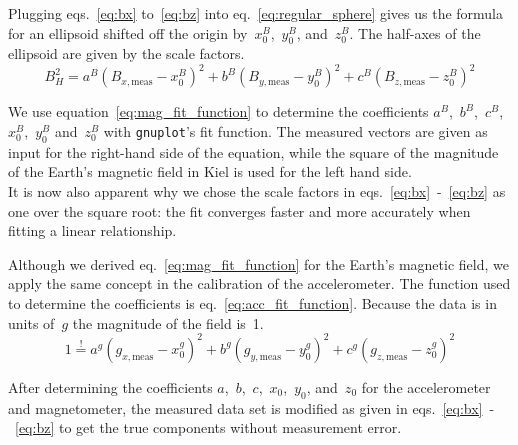 Plugging eqs.~\eqref{eq:bx} to~\eqref{eq:bz} into eq.~\eqref{eq:regular_sphere} gives us the formula for an ellipsoid shifted off the origin by~$x_0^B$,~$y_0^B$, and~$z_0^B$. The half-axes of the ellipsoid are given by the scale factors.
\begin{equation}
    B_{H}^2=a^B(B_{x,\mathrm{meas}}-x_0^B)^2 + b^B(B_{y,\mathrm{meas}}-y_0^B)^2 + c^B(B_{z,\mathrm{meas}}-z_0^B)^2 
    \label{eq:mag_fit_function}
\end{equation}

 We use equation~\eqref{eq:mag_fit_function} to determine the coefficients $a^B$,~$b^B$,~$c^B$,~$x_0^B$,~$y_0^B$ and~$z_0^B$ with \verb|gnuplot|'s fit function. The measured vectors are given as input for the right-hand side of the equation, while the square of the magnitude of the Earth's magnetic field in Kiel is used for the left hand side.\\
It is now also apparent why we chose the scale factors in eqs.~\eqref{eq:bx}~-~\eqref{eq:bz} as one over the square root: the fit converges faster and more accurately when fitting a linear relationship.

Although we derived eq.~\eqref{eq:mag_fit_function} for the Earth's magnetic field, we apply the same concept in the calibration of the accelerometer. The function used to determine the coefficients is eq.~\eqref{eq:acc_fit_function}. Because the data is in units of~$g$ the magnitude of the field is~1.
\begin{equation}
    1\overset{!}{=}a^g(g_{x,\mathrm{meas}}-x_0^g)^2 + b^g(g_{y,\mathrm{meas}}-y_0^g)^2 + c^g(g_{z,\mathrm{meas}}-z_0^g)^2
    \label{eq:acc_fit_function}
\end{equation}

After determining the coefficients $a$,~$b$,~$c$,~$x_0$,~$y_0$, and~$z_0$ for the accelerometer and magnetometer, the measured data set is modified as given in eqs.~\eqref{eq:bx}~-~\eqref{eq:bz} to get the true components without measurement error.

